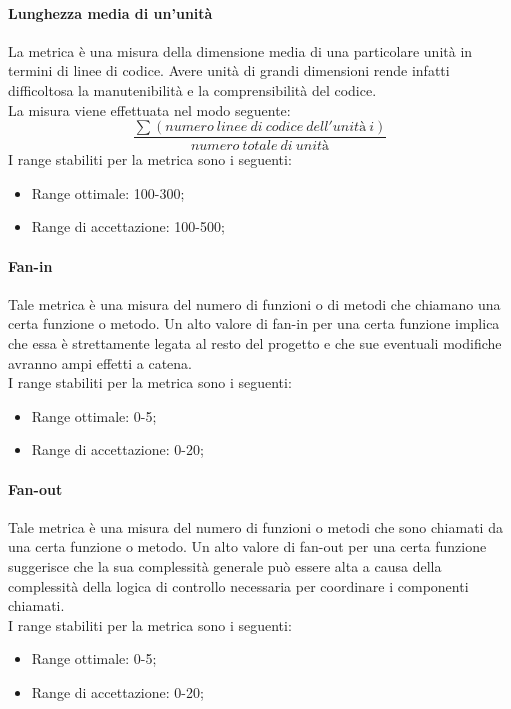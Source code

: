 			\paragraph{Lunghezza media di un'unità}
			La metrica è una misura della dimensione media di una particolare unità in termini di linee di codice. Avere unità di grandi dimensioni rende infatti difficoltosa la manutenibilità e la comprensibilità del codice.
			\\La misura viene effettuata nel modo seguente:
			\begin{equation}
				\frac{\sum(numero~linee~di~codice~dell'unità~i)}{numero~totale~di~unità}
			\end{equation}
			I range stabiliti per la metrica sono i seguenti:
			\begin{itemize}
				\item Range ottimale: 100-300;
				\item Range di accettazione: 100-500;
			\end{itemize}
			
			\paragraph{Fan-in}
			Tale metrica è una misura del numero di funzioni o di metodi che chiamano una certa funzione o metodo.
			Un alto valore di fan-in per una certa funzione implica che essa è strettamente legata al resto del progetto e che sue eventuali modifiche avranno ampi effetti a catena.
			\\I range stabiliti per la metrica sono i seguenti:
			\begin{itemize}
				\item Range ottimale: 0-5;
				\item Range di accettazione: 0-20;
			\end{itemize}
			
			\paragraph{Fan-out}
			Tale metrica è una misura del numero di funzioni o metodi che sono chiamati da una certa funzione o metodo. Un alto valore di fan-out per una certa funzione suggerisce che la sua complessità generale può essere alta a causa della complessità della logica di controllo necessaria per coordinare i componenti chiamati.
			\\I range stabiliti per la metrica sono i seguenti:
			\begin{itemize}
				\item Range ottimale: 0-5;
				\item Range di accettazione: 0-20;
			\end{itemize}
			
